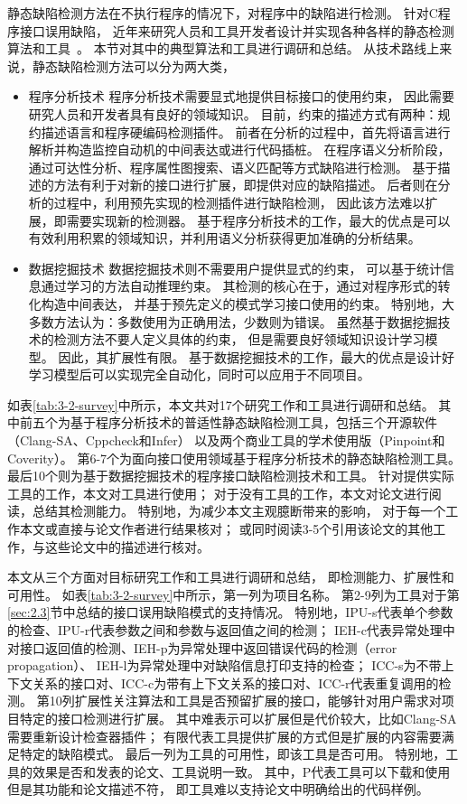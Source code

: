 静态缺陷检测方法在不执行程序的情况下，对程序中的缺陷进行检测。
针对C程序接口误用缺陷，
近年来研究人员和工具开发者设计并实现各种各样的静态检测算法和工具~\cite{16-saner-evaluation, survey18}。
本节对其中的典型算法和工具进行调研和总结。
从技术路线上来说，静态缺陷检测方法可以分为两大类，
\begin{itemize}
	\item {\kaishu 程序分析技术}
	程序分析技术需要显式地提供目标接口的使用约束，
	因此需要研究人员和开发者具有良好的领域知识。
	目前，约束的描述方式有两种：规约描述语言和程序硬编码检测插件。
	前者在分析的过程中，首先将语言进行解析并构造监控自动机的中间表达或进行代码插桩。
	在程序语义分析阶段，通过可达性分析、程序属性图搜索、语义匹配等方式缺陷进行检测。
	基于描述的方法有利于对新的接口进行扩展，即提供对应的缺陷描述。
	后者则在分析的过程中，利用预先实现的检测插件进行缺陷检测，
	因此该方法难以扩展，即需要实现新的检测器。
	基于程序分析技术的工作，最大的优点是可以有效利用积累的领域知识，并利用语义分析获得更加准确的分析结果。
	\item {\kaishu 数据挖掘技术}
	数据挖掘技术则不需要用户提供显式的约束，
	可以基于统计信息通过学习的方法自动推理约束。
	其检测的核心在于，通过对程序形式的转化构造中间表达，
	并基于预先定义的模式学习接口使用的约束。
	特别地，大多数方法认为：多数使用为正确用法，少数则为错误。
	虽然基于数据挖掘技术的检测方法不要人定义具体的约束，
	但是需要良好领域知识设计学习模型。
	因此，其扩展性有限。
	基于数据挖掘技术的工作，最大的优点是设计好学习模型后可以实现完全自动化，同时可以应用于不同项目。
\end{itemize}

如表\ref{tab:3-2-survey}中所示，本文共对17个研究工作和工具进行调研和总结。
其中前五个为基于程序分析技术的普适性静态缺陷检测工具，包括三个开源软件（Clang-SA、Cppcheck和Infer）
以及两个商业工具的学术使用版（Pinpoint和Coverity）。
第6-7个为面向接口使用领域基于程序分析技术的静态缺陷检测工具。
最后10个则为基于数据挖掘技术的程序接口缺陷检测技术和工具。
针对提供实际工具的工作，本文对工具进行使用；
对于没有工具的工作，本文对论文进行阅读，总结其检测能力。
特别地，为减少本文主观臆断带来的影响，
对于每一个工作本文或直接与论文作者进行结果核对；
或同时阅读3-5个引用该论文的其他工作，与这些论文中的描述进行核对。



本文从三个方面对目标研究工作和工具进行调研和总结，
即检测能力、扩展性和可用性。
如表\ref{tab:3-2-survey}中所示，第一列为项目名称。
第2-9列为工具对于第\ref{sec:2.3}节中总结的接口误用缺陷模式的支持情况。
特别地，IPU-s代表单个参数的检查、IPU-r代表参数之间和参数与返回值之间的检测；
IEH-c代表异常处理中对接口返回值的检测、IEH-p为异常处理中返回错误代码的检测（error propagation）、
IEH-l为异常处理中对缺陷信息打印支持的检查；
ICC-s为不带上下文关系的接口对、ICC-c为带有上下文关系的接口对、ICC-r代表重复调用的检测。
第10列扩展性关注算法和工具是否预留扩展的接口，能够针对用户需求对项目特定的接口检测进行扩展。
其中难表示可以扩展但是代价较大，比如Clang-SA需要重新设计检查器插件；
有限代表工具提供扩展的方式但是扩展的内容需要满足特定的缺陷模式。
最后一列为工具的可用性，即该工具是否可用。
特别地，工具的效果是否和发表的论文、工具说明一致。
其中，P代表工具可以下载和使用但是其功能和论文描述不符，
即工具难以支持论文中明确给出的代码样例。

